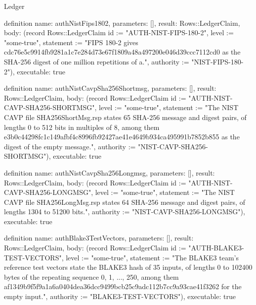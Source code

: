 \begin{lexlean}{Ledger}
\begin{semanticmodule}
definition{
  name: authNistFips1802,
  parameters: [],
  result: Rows::LedgerClaim,
  body: (record Rows::LedgerClaim {id := "AUTH-NIST-FIPS-180-2", level := "some-true", statement := "FIPS 180-2 gives cdc76e5c9914fb9281a1c7e284d73e67f1809a48a497200e046d39ccc7112cd0 as the SHA-256 digest of one million repetitions of a.", authority := "NIST-FIPS-180-2"}),
  executable: true
}

definition{
  name: authNistCavpSha256Shortmsg,
  parameters: [],
  result: Rows::LedgerClaim,
  body: (record Rows::LedgerClaim {id := "AUTH-NIST-CAVP-SHA256-SHORTMSG", level := "some-true", statement := "The NIST CAVP file SHA256ShortMsg.rsp states 65 SHA-256 message and digest pairs, of lengths 0 to 512 bits in multiples of 8, among them e3b0c44298fc1c149afbf4c8996fb92427ae41e4649b934ca495991b7852b855 as the digest of the empty message.", authority := "NIST-CAVP-SHA256-SHORTMSG"}),
  executable: true
}

definition{
  name: authNistCavpSha256Longmsg,
  parameters: [],
  result: Rows::LedgerClaim,
  body: (record Rows::LedgerClaim {id := "AUTH-NIST-CAVP-SHA256-LONGMSG", level := "some-true", statement := "The NIST CAVP file SHA256LongMsg.rsp states 64 SHA-256 message and digest pairs, of lengths 1304 to 51200 bits.", authority := "NIST-CAVP-SHA256-LONGMSG"}),
  executable: true
}

definition{
  name: authBlake3TestVectors,
  parameters: [],
  result: Rows::LedgerClaim,
  body: (record Rows::LedgerClaim {id := "AUTH-BLAKE3-TEST-VECTORS", level := "some-true", statement := "The BLAKE3 team's reference test vectors state the BLAKE3 hash of 35 inputs, of lengths 0 to 102400 bytes of the repeating sequence 0, 1, ..., 250, among them af1349b9f5f9a1a6a0404dea36dcc9499bcb25c9adc112b7cc9a93cae41f3262 for the empty input.", authority := "BLAKE3-TEST-VECTORS"}),
  executable: true
}
\end{semanticmodule}
\end{lexlean}

